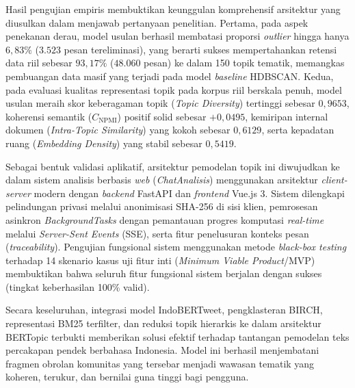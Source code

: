 Hasil pengujian empiris membuktikan keunggulan komprehensif arsitektur yang diusulkan dalam menjawab pertanyaan penelitian. Pertama, pada aspek penekanan derau, model usulan berhasil membatasi proporsi \textit{outlier} hingga hanya $6{,}83\%$ ($3.523$ pesan tereliminasi), yang berarti sukses mempertahankan retensi data riil sebesar $93{,}17\%$ ($48.060$ pesan) ke dalam 150 topik tematik, memangkas pembuangan data masif yang terjadi pada model \textit{baseline} HDBSCAN. Kedua, pada evaluasi kualitas representasi topik pada korpus riil berskala penuh, model usulan meraih skor keberagaman topik (\textit{Topic Diversity}) tertinggi sebesar $0{,}9653$, koherensi semantik ($C_{\text{NPMI}}$) positif solid sebesar $+0{,}0495$, kemiripan internal dokumen (\textit{Intra-Topic Similarity}) yang kokoh sebesar $0{,}6129$, serta kepadatan ruang (\textit{Embedding Density}) yang stabil sebesar $0{,}5419$.

Sebagai bentuk validasi aplikatif, arsitektur pemodelan topik ini diwujudkan ke dalam sistem analisis berbasis \textit{web} (\textit{ChatAnalisis}) menggunakan arsitektur \textit{client-server} modern dengan \textit{backend} FastAPI dan \textit{frontend} Vue.js 3. Sistem dilengkapi pelindungan privasi melalui anonimisasi SHA-256 di sisi klien, pemrosesan asinkron \textit{BackgroundTasks} dengan pemantauan progres komputasi \textit{real-time} melalui \textit{Server-Sent Events} (SSE), serta fitur penelusuran konteks pesan (\textit{traceability}). Pengujian fungsional sistem menggunakan metode \textit{black-box testing} terhadap 14 skenario kasus uji fitur inti (\textit{Minimum Viable Product}/MVP) membuktikan bahwa seluruh fitur fungsional sistem berjalan dengan sukses (tingkat keberhasilan 100\% valid).

Secara keseluruhan, integrasi model IndoBERTweet, pengklasteran BIRCH, representasi BM25 terfilter, dan reduksi topik hierarkis ke dalam arsitektur BERTopic terbukti memberikan solusi efektif terhadap tantangan pemodelan teks percakapan pendek berbahasa Indonesia. Model ini berhasil menjembatani fragmen obrolan komunitas yang tersebar menjadi wawasan tematik yang koheren, terukur, dan bernilai guna tinggi bagi pengguna.

\vspace{0.5cm}

\newpage

